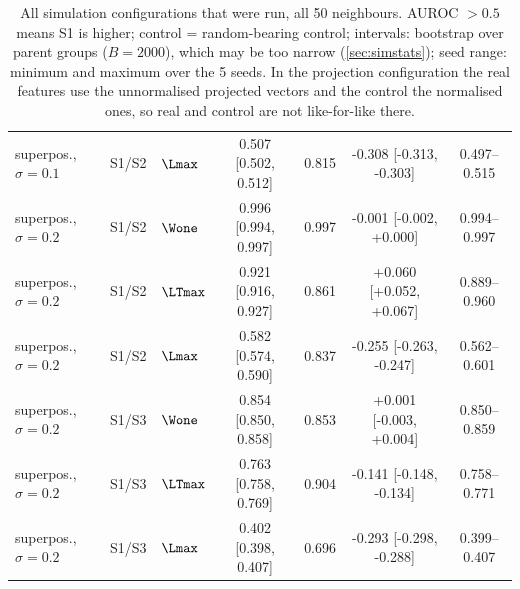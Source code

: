 \begin{table}[p]
\begin{tabular}{lllcccc}
superpos., $\sigma{=}0.1$ & S1/S2 & $\Lmax$ & 0.507 [0.502, 0.512] & 0.815 & -0.308 [-0.313, -0.303] & 0.497--0.515 \\
superpos., $\sigma{=}0.2$ & S1/S2 & $\Wone$ & 0.996 [0.994, 0.997] & 0.997 & -0.001 [-0.002, +0.000] & 0.994--0.997 \\
superpos., $\sigma{=}0.2$ & S1/S2 & $\LTmax$ & 0.921 [0.916, 0.927] & 0.861 & +0.060 [+0.052, +0.067] & 0.889--0.960 \\
superpos., $\sigma{=}0.2$ & S1/S2 & $\Lmax$ & 0.582 [0.574, 0.590] & 0.837 & -0.255 [-0.263, -0.247] & 0.562--0.601 \\
superpos., $\sigma{=}0.2$ & S1/S3 & $\Wone$ & 0.854 [0.850, 0.858] & 0.853 & +0.001 [-0.003, +0.004] & 0.850--0.859 \\
superpos., $\sigma{=}0.2$ & S1/S3 & $\LTmax$ & 0.763 [0.758, 0.769] & 0.904 & -0.141 [-0.148, -0.134] & 0.758--0.771 \\
superpos., $\sigma{=}0.2$ & S1/S3 & $\Lmax$ & 0.402 [0.398, 0.407] & 0.696 & -0.293 [-0.298, -0.288] & 0.399--0.407 \\
\bottomrule
\end{tabular}
\caption{All simulation configurations that were run, all 50 neighbours. AUROC $>0.5$ means S1 is higher; control = random-bearing control; intervals: bootstrap over parent groups ($B=2000$), which may be too narrow (\cref{sec:simstats}); seed range: minimum and maximum over the 5 seeds. In the projection configuration the real features use the unnormalised projected vectors and the control the normalised ones, so real and control are not like-for-like there.}
\label{tab:simall}
\end{table}
